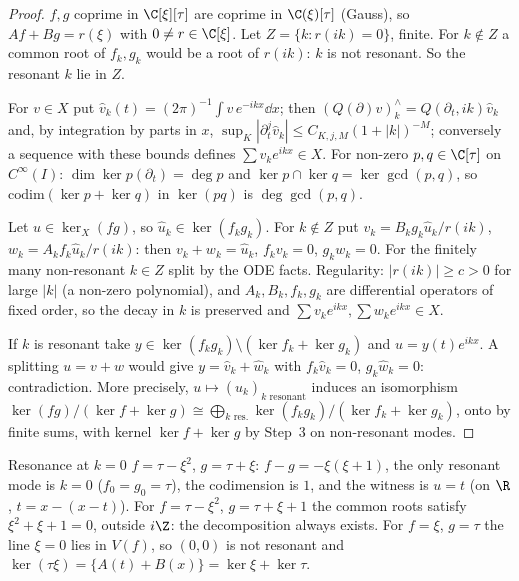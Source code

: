 \begin{proof}
$f,g$ coprime in $\C[\xi][\tau]$ are coprime in $\C(\xi)[\tau]$ (Gauss), so $Af+Bg=r(\xi)$ with $0\ne r\in\C[\xi]$. Let $Z=\{k:r(ik)=0\}$, finite. For $k\notin Z$ a common root of $f_k,g_k$ would be a root of $r(ik)$: $k$ is not resonant. So the resonant $k$ lie in $Z$.

For $v\in X$ put $\hat v_k(t)=(2\pi)^{-1}\int v\,e^{-ikx}\dd x$; then $(Q(\partial)v)^\wedge_k=Q(\partial_t,ik)\hat v_k$ and, by integration by parts in $x$, $\sup_K|\partial_t^j\hat v_k|\le C_{K,j,M}(1+|k|)^{-M}$; conversely a sequence with these bounds defines $\sum v_ke^{ikx}\in X$. For non-zero $p,q\in\C[\tau]$ on $C^\infty(I)$: $\dim\ker p(\partial_t)=\deg p$ and $\ker p\cap\ker q=\ker\gcd(p,q)$, so $\mathrm{codim}(\ker p+\ker q)$ in $\ker(pq)$ is $\deg\gcd(p,q)$.

Let $u\in\ker_X(fg)$, so $\hat u_k\in\ker(f_kg_k)$. For $k\notin Z$ put $v_k=B_kg_k\hat u_k/r(ik)$, $w_k=A_kf_k\hat u_k/r(ik)$: then $v_k+w_k=\hat u_k$, $f_kv_k=0$, $g_kw_k=0$. For the finitely many non-resonant $k\in Z$ split by the ODE facts. Regularity: $|r(ik)|\ge c>0$ for large $|k|$ (a non-zero polynomial), and $A_k,B_k,f_k,g_k$ are differential operators of fixed order, so the decay in $k$ is preserved and $\sum v_ke^{ikx},\sum w_ke^{ikx}\in X$.

If $k$ is resonant take $y\in\ker(f_kg_k)\setminus(\ker f_k+\ker g_k)$ and $u=y(t)e^{ikx}$. A splitting $u=v+w$ would give $y=\hat v_k+\hat w_k$ with $f_k\hat v_k=0$, $g_k\hat w_k=0$: contradiction. More precisely, $u\mapsto(\hat u_k)_{k\text{ resonant}}$ induces an isomorphism $\ker(fg)/(\ker f+\ker g)\cong\bigoplus_{k\text{ res.}}\ker(f_kg_k)/(\ker f_k+\ker g_k)$, onto by finite sums, with kernel $\ker f+\ker g$ by Step~3 on non-resonant modes.

\end{proof}

\begin{example}{Resonance at $k=0$}
$f=\tau-\xi^2$, $g=\tau+\xi$: $f-g=-\xi(\xi+1)$, the only resonant mode is $k=0$ ($f_0=g_0=\tau$), the codimension is $1$, and the witness is $u=t$ (on $\R$, $t=x-(x-t)$). For $f=\tau-\xi^2$, $g=\tau+\xi+1$ the common roots satisfy $\xi^2+\xi+1=0$, outside $i\Z$: the decomposition always exists. For $f=\xi$, $g=\tau$ the line $\xi=0$ lies in $V(f)$, so $(0,0)$ is not resonant and $\ker(\tau\xi)=\{A(t)+B(x)\}=\ker\xi+\ker\tau$.
\end{example}

